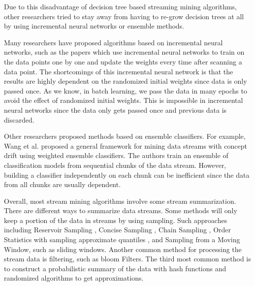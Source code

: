 \documentclass[conference]{IEEEtran}
\begin{document}
		
		Due to this disadvantage of decision tree based streaming mining algorithms, other researchers tried to stay away from having to re-grow decision trees at all by using incremental neural networks or ensemble methods.
		
		Many researchers have proposed algorithms based on incremental neural networks, such as the papers \cite{NN1,NN2,NN3,NN4} which use incremental neural networks to train on the data points one by one and update the weights every time after scanning a data point. The shortcomings of this incremental neural network is that the results are highly dependent on the randomized initial weights since data is only passed once. As we know, in batch learning, we pass the data in many epochs to avoid the effect of randomized initial weights. This is impossible in incremental neural networks since the data only gets passed once and previous data is discarded.
		
		Other researchers proposed methods based on ensemble classifiers. For example, Wang et al.\cite{ensemble1} proposed a general framework for mining data streams with concept drift using weighted ensemble classifiers. The authors train an ensemble of classification models from sequential chunks of the data stream. However, building a classifier independently on each chunk can be inefficient since the data from all chunks are usually dependent. 
		
		Overall, most stream mining algorithms involve some stream summarization. There are different ways to summarize data streams. Some methods will only keep a portion of the data in streams by using sampling. Such approaches including Reservoir Sampling \cite{vitter}, Concise Sampling \cite{Gibbons}, Chain Sampling \cite{Babcock}, Order Statistics with sampling approximate quantiles \cite{Manku}, and Sampling from a Moving Window, such as sliding windows. Another common method for processing the stream data is filtering, such as bloom Filters. The third most common method is to construct a probabilistic summary of the data with hash functions and randomized algorithms to get approximations. 
		
\end{document}
